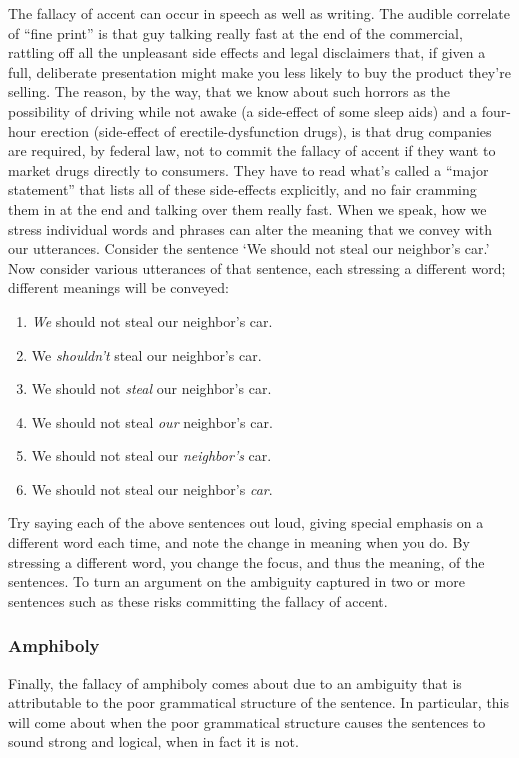 The fallacy of accent can occur in speech as well as writing. The audible correlate of ``fine print''
is that guy talking really fast at the end of the commercial, rattling off all the unpleasant side effects
and legal disclaimers that, if given a full, deliberate presentation might make you less likely to buy
the product they're selling. The reason, by the way, that we know about such horrors as the
possibility of driving while not awake (a side-effect of some sleep aids) and a four-hour erection
(side-effect of erectile-dysfunction drugs), is that drug companies are required, by federal law, not
to commit the fallacy of accent if they want to market drugs directly to consumers. They have to
read what's called a ``major statement'' that lists all of these side-effects explicitly, and no fair
cramming them in at the end and talking over them really fast.
When we speak, how we stress individual words and phrases can alter the meaning that we convey
with our utterances. Consider the sentence `We should not steal our neighbor's car.' Now consider
various utterances of that sentence, each stressing a different word; different meanings will be
conveyed:

\begin{enumerate}
\item \emph{We} should not steal our neighbor's car.
\item We \emph{shouldn't} steal our neighbor's car.
\item We should not \emph{steal} our neighbor's car.
\item We should not steal \emph{our} neighbor's car.
\item We should not steal our \emph{neighbor's} car.
\item We should not steal our neighbor's \emph{car}.
\end{enumerate}

Try saying each of the above sentences out loud, giving special emphasis on a different word each time, and note the change in meaning when you do.
By stressing a different word, you change the focus, and thus the meaning, of the sentences. To turn an argument on the ambiguity captured in two 
or more sentences such as these risks committing the fallacy of accent.

\subsubsection{Amphiboly}


Finally, the fallacy of amphiboly comes about due to an ambiguity that is attributable to the poor grammatical structure of the sentence.
In particular, this will come about when the poor grammatical structure causes the sentences to sound strong and logical, when in fact it is not.

